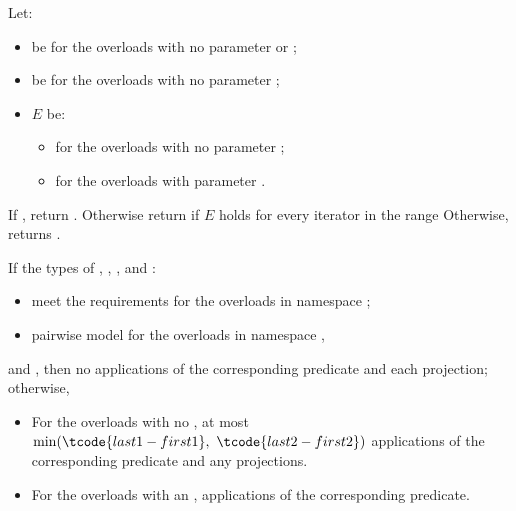 \begin{itemdescr}
\pnum
Let:
\begin{itemize}
\item
   be 
  for the overloads with no parameter  or ;
\item
   be 
  for the overloads with no parameter ;
\item
  $E$ be:
  \begin{itemize}
  \setlength{\emergencystretch}{1em}
  \item
    for the overloads with no parameter ;
  \item
    for the overloads with parameter .
  \end{itemize}
\end{itemize}

\pnum
\returns
If , return .
Otherwise return 
if $E$ holds for every iterator  in the range 
Otherwise, returns .

\pnum
\complexity
If the types of , , , and :
\begin{itemize}
\item
  meet the
   requirements
  for the overloads in namespace ;
\item
  pairwise model 
  for the overloads in namespace ,
\end{itemize}
and ,
then no applications of the corresponding predicate and each projection;
otherwise,
\begin{itemize}
\item
  For the overloads with no ,
  at most $\min(\tcode{last1 - first1}, \ \tcode{last2 - first2})$
  applications of the corresponding predicate and any projections.
\item
  For the overloads with an ,
  applications of the corresponding predicate.
\end{itemize}
\end{itemdescr}

